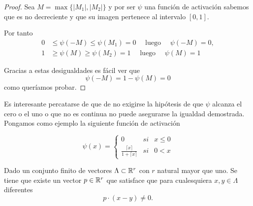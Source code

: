 \begin{proof}
Sea $M = \max \{|M_1|,|M_2|\}$ y por ser $\psi$ una función de activación sabemos que
es no decreciente y que su imagen pertenece al intervalo $[0,1].$

Por tanto
\begin{align}
      0 &\leq \psi(-M) \leq \psi(M_1) = 0 \quad \text{ luego } \quad \psi(-M) = 0, \\
      1 &\geq \psi(M) \geq \psi(M_2) = 1 \quad \text{ luego } \quad\psi(M) = 1
\end{align}

Gracias a estas desigualdades es fácil ver que 
\begin{equation}
    \psi(-M) = 1 - \psi(M) = 0
\end{equation}
como queríamos probar. 
\end{proof}   

Es interesante percatarse de que de no exigirse la hipótesis de 
que $\psi$ alcanza el cero o el uno o que no es continua no puede 
asegurarse la igualdad demostrada. Pongamos como ejemplo la siguiente función de activación

\begin{equation}
    \psi(x)= \left\{ \begin{array}{lcc}
        0 &   si  & x \leq 0 \\
        \frac{\lceil x \rceil}{1+ \lceil x \rceil}&  si & 0< x  
        \end{array}
    \right. 
\end{equation}

\begin{lema}\label{lema:previo_propio_2_al_teorema_2_5}
    Dado un conjunto finito de vectores $\Lambda \subset \mathbb{R}^r$ con 
    $r$ natural mayor que uno. 
    Se tiene que existe un vector $p \in \mathbb{R}^r$ que satisface que 
    para cualesquiera $x,y \in \Lambda$ diferentes 
    \begin{equation}
        p \cdot(x-y) \neq 0.
    \end{equation}
\end{lema}

